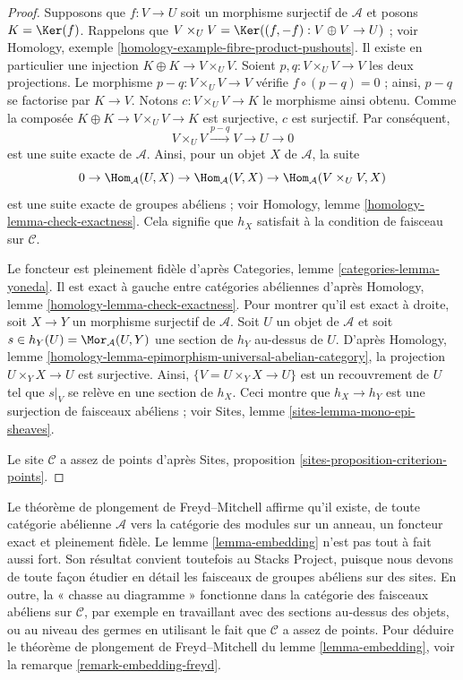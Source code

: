 \begin{proof}
Supposons que $f : V \to U$ soit un morphisme surjectif de $\mathcal{A}$ et
posons $K = \Ker(f)$. Rappelons que
$V \times_U V = \Ker((f, -f) : V \oplus V \to U)$ ; voir
Homology, exemple \ref{homology-example-fibre-product-pushouts}. Il existe en
particulier une injection $K \oplus K \to V \times_U V$. Soient
$p, q : V \times_U V \to V$ les deux projections. Le morphisme
$p - q : V \times_U V \to V$ vérifie $f \circ (p  - q) = 0$ ; ainsi,
$p - q$ se factorise par $K \to V$. Notons
$c : V \times_U V \to K$ le morphisme ainsi
obtenu. Comme la composée $K \oplus K \to V \times_U V \to K$ est
surjective, $c$ est surjectif. Par conséquent,
$$
V \times_U V \xrightarrow{p - q} V \to U \to 0
$$
est une suite exacte de $\mathcal{A}$. Ainsi, pour un objet $X$ de
$\mathcal{A}$, la suite
$$
0 \to
\Hom_\mathcal{A}(U, X) \to
\Hom_\mathcal{A}(V, X) \to
\Hom_\mathcal{A}(V \times_U V, X)
$$
est une suite exacte de groupes abéliens ; voir
Homology, lemme \ref{homology-lemma-check-exactness}. Cela signifie que $h_X$
satisfait à la condition de faisceau sur $\mathcal{C}$.

\medskip\noindent
Le foncteur est pleinement fidèle d'après
Categories, lemme \ref{categories-lemma-yoneda}. Il est exact à gauche entre
catégories abéliennes d'après
Homology, lemme \ref{homology-lemma-check-exactness}. Pour montrer qu'il est
exact à droite, soit $X \to Y$ un morphisme surjectif de $\mathcal{A}$. Soit
$U$ un objet de $\mathcal{A}$ et soit
$s \in h_Y(U) = \Mor_\mathcal{A}(U, Y)$ une section de $h_Y$ au-dessus de
$U$. D'après
Homology, lemme \ref{homology-lemma-epimorphism-universal-abelian-category},
la projection $U \times_Y X \to U$ est surjective. Ainsi,
$\{V = U \times_Y X \to U\}$ est un recouvrement de $U$ tel que $s|_V$ se
relève en une section de $h_X$. Ceci montre que $h_X \to h_Y$ est une
surjection de faisceaux abéliens ; voir
Sites, lemme \ref{sites-lemma-mono-epi-sheaves}.

\medskip\noindent
Le site $\mathcal{C}$ a assez de points d'après
Sites, proposition \ref{sites-proposition-criterion-points}.
\end{proof}

\begin{remark}
\label{remark-embedding}
Le théorème de plongement de Freyd--Mitchell affirme qu'il existe, de toute
catégorie abélienne $\mathcal{A}$ vers la catégorie des modules sur un anneau,
un foncteur exact et pleinement fidèle. Le lemme \ref{lemma-embedding} n'est
pas tout à fait aussi fort. Son résultat convient toutefois au Stacks Project,
puisque nous devons de toute façon étudier en détail les faisceaux de groupes
abéliens sur des sites. En outre, la « chasse au diagramme » fonctionne dans la
catégorie des faisceaux abéliens sur $\mathcal{C}$, par exemple en travaillant
avec des sections au-dessus des objets, ou au niveau des germes en utilisant le
fait que $\mathcal{C}$ a assez de points. Pour déduire le théorème de plongement
de Freyd--Mitchell du lemme \ref{lemma-embedding}, voir la
remarque \ref{remark-embedding-freyd}.
\end{remark}

